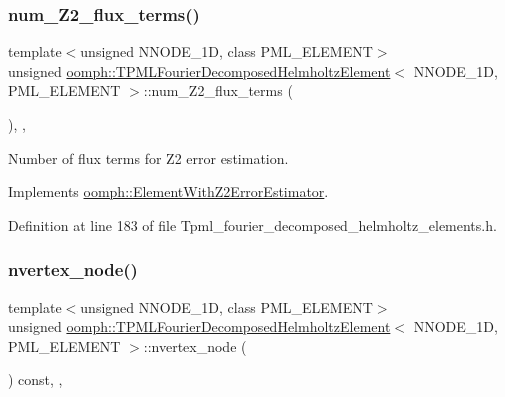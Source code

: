 \subsubsection{\texorpdfstring{num\+\_\+\+Z2\+\_\+flux\+\_\+terms()}{num\_Z2\_flux\_terms()}}
{\footnotesize\ttfamily template$<$unsigned N\+N\+O\+D\+E\+\_\+1D, class P\+M\+L\+\_\+\+E\+L\+E\+M\+E\+NT$>$ \\
unsigned \hyperlink{classoomph_1_1TPMLFourierDecomposedHelmholtzElement}{oomph\+::\+T\+P\+M\+L\+Fourier\+Decomposed\+Helmholtz\+Element}$<$ N\+N\+O\+D\+E\+\_\+1D, P\+M\+L\+\_\+\+E\+L\+E\+M\+E\+NT $>$\+::num\+\_\+\+Z2\+\_\+flux\+\_\+terms (\begin{DoxyParamCaption}{ }\end{DoxyParamCaption})\hspace{0.3cm}{\ttfamily [inline]}, {\ttfamily [protected]}, {\ttfamily [virtual]}}



Number of \textquotesingle{}flux\textquotesingle{} terms for Z2 error estimation. 



Implements \hyperlink{classoomph_1_1ElementWithZ2ErrorEstimator_ae82c5728902e13da31be19c390fc28e3}{oomph\+::\+Element\+With\+Z2\+Error\+Estimator}.



Definition at line 183 of file Tpml\+\_\+fourier\+\_\+decomposed\+\_\+helmholtz\+\_\+elements.\+h.

\mbox{\label{classoomph_1_1TPMLFourierDecomposedHelmholtzElement_a1fe9d66fb864483105f2d2cbabd072a0}} 
\subsubsection{\texorpdfstring{nvertex\+\_\+node()}{nvertex\_node()}}
{\footnotesize\ttfamily template$<$unsigned N\+N\+O\+D\+E\+\_\+1D, class P\+M\+L\+\_\+\+E\+L\+E\+M\+E\+NT$>$ \\
unsigned \hyperlink{classoomph_1_1TPMLFourierDecomposedHelmholtzElement}{oomph\+::\+T\+P\+M\+L\+Fourier\+Decomposed\+Helmholtz\+Element}$<$ N\+N\+O\+D\+E\+\_\+1D, P\+M\+L\+\_\+\+E\+L\+E\+M\+E\+NT $>$\+::nvertex\+\_\+node (\begin{DoxyParamCaption}{ }\end{DoxyParamCaption}) const\hspace{0.3cm}{\ttfamily [inline]}, {\ttfamily [protected]}, {\ttfamily [virtual]}}



